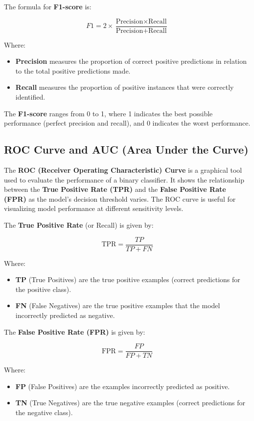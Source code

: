 \documentclass[conference]{IEEEtran}
\begin{document}
	The formula for \textbf{F1-score} is:
	
	\[
	F1 = 2 \times \frac{\text{Precision} \times \text{Recall}}{\text{Precision} + \text{Recall}}
	\]
	
	Where:
	
	\begin{itemize}
		\item \textbf{Precision} measures the proportion of correct positive predictions in relation to the total positive predictions made.
		\item \textbf{Recall} measures the proportion of positive instances that were correctly identified.
	\end{itemize}
	
	The \textbf{F1-score} ranges from 0 to 1, where 1 indicates the best possible performance (perfect precision and recall), and 0 indicates the worst performance.
	
	\subsection{ROC Curve and AUC (Area Under the Curve)}
	
	The \textbf{ROC (Receiver Operating Characteristic) Curve} is a graphical tool used to evaluate the performance of a binary classifier. It shows the relationship between the \textbf{True Positive Rate (TPR)} and the \textbf{False Positive Rate (FPR)} as the model's decision threshold varies. The ROC curve is useful for visualizing model performance at different sensitivity levels.
	
	The \textbf{True Positive Rate} (or Recall) is given by:
	
	\[
	\text{TPR} = \frac{TP}{TP + FN}
	\]
	
	Where:
	
	\begin{itemize}
		\item \textbf{TP} (True Positives) are the true positive examples (correct predictions for the positive class).
		\item \textbf{FN} (False Negatives) are the true positive examples that the model incorrectly predicted as negative.
	\end{itemize}
	
	The \textbf{False Positive Rate (FPR)} is given by:
	
	\[
	\text{FPR} = \frac{FP}{FP + TN}
	\]
	
	Where:
	
	\begin{itemize}
		\item \textbf{FP} (False Positives) are the examples incorrectly predicted as positive.
		\item \textbf{TN} (True Negatives) are the true negative examples (correct predictions for the negative class).
	\end{itemize}
	
\end{document}
